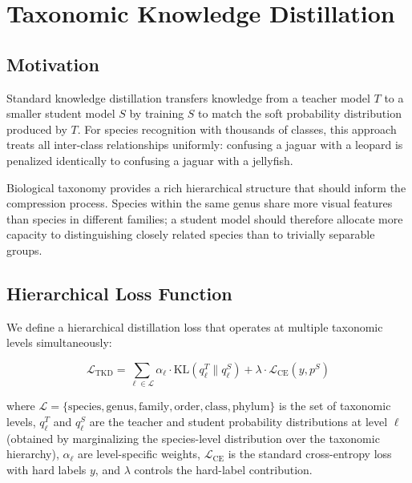 \section{Taxonomic Knowledge Distillation}

\label{sec:distillation}

\subsection{Motivation}

Standard knowledge distillation \citep{hinton2015distilling} transfers knowledge from a teacher model $T$ to a smaller student model $S$ by training $S$ to match the soft probability distribution produced by $T$.
For species recognition with thousands of classes, this approach treats all inter-class relationships uniformly: confusing a jaguar with a leopard is penalized identically to confusing a jaguar with a jellyfish.

Biological taxonomy provides a rich hierarchical structure that should inform the compression process.
Species within the same genus share more visual features than species in different families; a student model should therefore allocate more capacity to distinguishing closely related species than to trivially separable groups.

\subsection{Hierarchical Loss Function}

We define a hierarchical distillation loss that operates at multiple taxonomic levels simultaneously:

\begin{equation}
    \mathcal{L}_{\text{TKD}} = \sum_{\ell \in \mathcal{L}} \alpha_\ell \cdot \text{KL}\left(q_\ell^T \| q_\ell^S\right) + \lambda \cdot \mathcal{L}_{\text{CE}}(y, p^S)
\end{equation}

\noindent where $\mathcal{L} = \{\text{species}, \text{genus}, \text{family}, \text{order}, \text{class}, \text{phylum}\}$ is the set of taxonomic levels, $q_\ell^T$ and $q_\ell^S$ are the teacher and student probability distributions at level $\ell$ (obtained by marginalizing the species-level distribution over the taxonomic hierarchy), $\alpha_\ell$ are level-specific weights, $\mathcal{L}_{\text{CE}}$ is the standard cross-entropy loss with hard labels $y$, and $\lambda$ controls the hard-label contribution.

